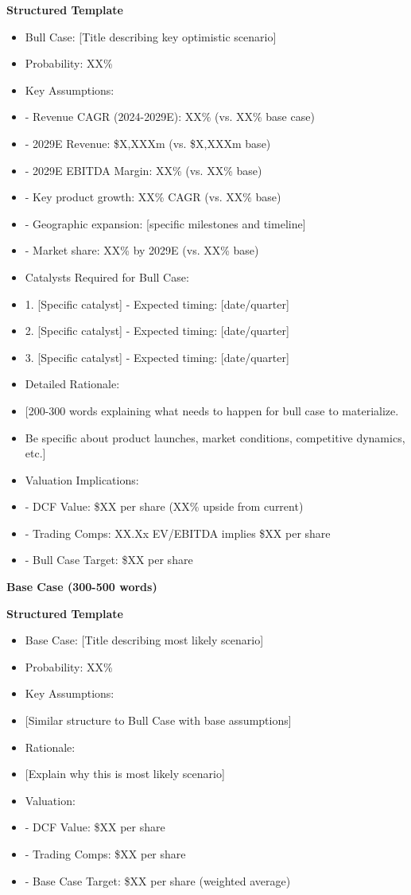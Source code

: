 \documentclass[11pt]{article}
\begin{document}
\textbf{Structured Template}
\begin{itemize}[leftmargin=*,itemsep=2pt,topsep=2pt]
\item {} Bull Case: [Title describing key optimistic scenario]
\item {} Probability: XX\%
\item {} Key Assumptions:
\item {} - Revenue CAGR (2024-2029E): XX\% (vs. XX\% base case)
\item {} - 2029E Revenue: \$X,XXXm (vs. \$X,XXXm base)
\item {} - 2029E EBITDA Margin: XX\% (vs. XX\% base)
\item {} - Key product growth: XX\% CAGR (vs. XX\% base)
\item {} - Geographic expansion: [specific milestones and timeline]
\item {} - Market share: XX\% by 2029E (vs. XX\% base)
\item {} Catalysts Required for Bull Case:
\item {} 1. [Specific catalyst] - Expected timing: [date/quarter]
\item {} 2. [Specific catalyst] - Expected timing: [date/quarter]
\item {} 3. [Specific catalyst] - Expected timing: [date/quarter]
\item {} Detailed Rationale:
\item {} [200-300 words explaining what needs to happen for bull case to materialize.
\item {} Be specific about product launches, market conditions, competitive dynamics, etc.]
\item {} Valuation Implications:
\item {} - DCF Value: \$XX per share (XX\% upside from current)
\item {} - Trading Comps: XX.Xx EV/EBITDA implies \$XX per share
\item {} - Bull Case Target: \$XX per share
\end{itemize}

\textbf{Base Case (300-500 words)}

\textbf{Structured Template}
\begin{itemize}[leftmargin=*,itemsep=2pt,topsep=2pt]
\item {} Base Case: [Title describing most likely scenario]
\item {} Probability: XX\%
\item {} Key Assumptions:
\item {} [Similar structure to Bull Case with base assumptions]
\item {} Rationale:
\item {} [Explain why this is most likely scenario]
\item {} Valuation:
\item {} - DCF Value: \$XX per share
\item {} - Trading Comps: \$XX per share
\item {} - Base Case Target: \$XX per share (weighted average)
\end{itemize}
\end{document}

